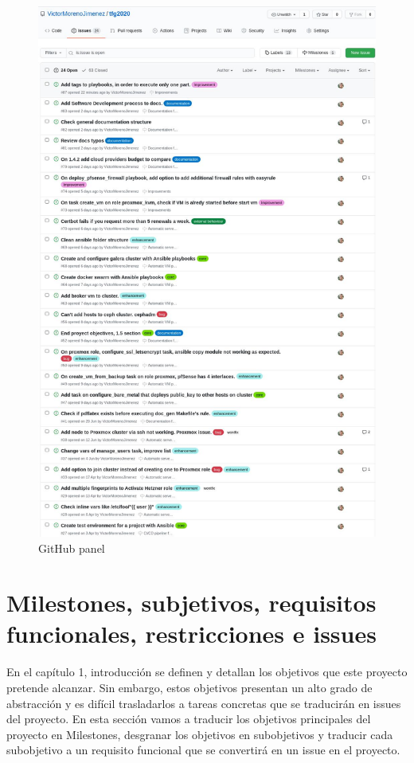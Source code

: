 \begin{text}
        \begin{figure}[!hbt]
                \centering
                \includegraphics[scale=0.5]{imagenes/Analisis/githubissues.jpg}
                \caption[GitHub panel]{GitHub panel}
                \label{github_issues}
        \end{figure}
\end{text}
\clearpage

\section{Milestones, subjetivos, requisitos funcionales, restricciones e issues}
        \begin{text}
                En el capítulo 1, introducción se definen y detallan los objetivos que este proyecto pretende alcanzar. Sin embargo, estos objetivos presentan un alto grado de abstracción y es difícil trasladarlos a tareas concretas que se traducirán en issues del proyecto. En esta sección vamos a traducir los objetivos principales del proyecto en Milestones, desgranar los objetivos en subobjetivos y traducir cada subobjetivo a un requisito funcional que se convertirá en un issue en el proyecto.
        \end{text}

